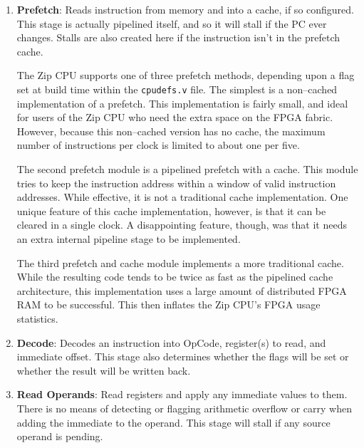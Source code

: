 \documentclass{gqtekspec}
\begin{document}
\begin{enumerate}
\item {\bf Prefetch}: Reads instruction from memory and into a cache, if so 
	configured.  This
	stage is actually pipelined itself, and so it will stall if the PC
	ever changes.  Stalls are also created here if the instruction isn't
	in the prefetch cache.

	The Zip CPU supports one of three prefetch methods, depending upon a
	flag set at build time within the {\tt cpudefs.v} file.  The simplest
	is a non--cached implementation of a prefetch.  This implementation is
	fairly small, and ideal for users of the Zip CPU who need the extra
	space on the FPGA fabric.  However, because this non--cached version
	has no cache, the maximum number of instructions per clock is limited
	to about one per five.

	The second prefetch module is a pipelined prefetch with a cache.  This
	module tries to keep the instruction address within a window of valid
	instruction addresses.  While effective, it is not a traditional
	cache implementation.  One unique feature of this cache implementation,
	however, is that it can be cleared in a single clock.  A disappointing
	feature, though, was that it needs an extra internal pipeline stage
	to be implemented.

	The third prefetch and cache module implements a more traditional cache.
	While the resulting code tends to be twice as fast as the pipelined
	cache architecture, this implementation uses a large amount of 
	distributed FPGA RAM to be successful.  This then inflates the Zip CPU's
	FPGA usage statistics.

\item {\bf Decode}: Decodes an instruction into OpCode, register(s) to read,
	and immediate offset.  This stage also determines whether the flags
	will be set or whether the result will be written back.

\item {\bf Read Operands}: Read registers and apply any immediate values to
	them.  There is no means of detecting or flagging arithmetic overflow
	or carry when adding the immediate to the operand.  This stage will
	stall if any source operand is pending.


\end{enumerate}
\end{document}
